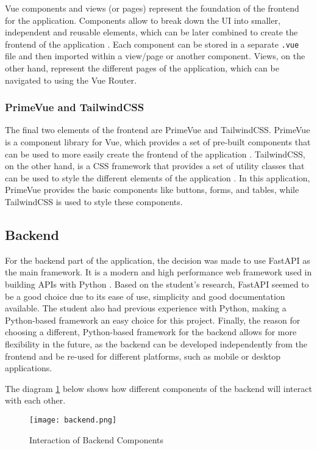 Vue components and views (or pages) represent the foundation of the frontend for the application. Components allow to break down the UI into smaller, independent and reusable elements, which can be later combined to create the frontend of the application \parencite{vuecomponents}. Each component can be stored in a separate \lstinline{.vue} file and then imported within a view/page or another component. Views, on the other hand, represent the different pages of the application, which can be navigated to using the Vue Router.

\subsubsection{PrimeVue and TailwindCSS}

The final two elements of the frontend are PrimeVue and TailwindCSS. PrimeVue is a component library for Vue, which provides a set of pre-built components that can be used to more easily create the frontend of the application \parencite{primevue}. TailwindCSS, on the other hand, is a CSS framework that provides a set of utility classes that can be used to style the different elements of the application \parencite{tailwind}. In this application, PrimeVue provides the basic components like buttons, forms, and tables, while TailwindCSS is used to style these components.

\subsection{Backend}

For the backend part of the application, the decision was made to use FastAPI as the main framework. It is a modern and high performance web framework used in building APIs with Python \parencite{fastapi}. Based on the student's research, FastAPI seemed to be a good choice due to its ease of use, simplicity and good documentation available. The student also had previous experience with Python, making a Python-based framework an easy choice for this project. Finally, the reason for choosing a different, Python-based framework for the backend allows for more flexibility in the future, as the backend can be developed independently from the frontend and be re-used for different platforms, such as mobile or desktop applications. 

The diagram \ref{fig:backend} below shows how different components of the backend will interact with each other.

\begin{figure}[htbp]
    \centering
    \texttt{[image: backend.png]}
    \caption{Interaction of Backend Components}
    \label{fig:backend}
\end{figure}

